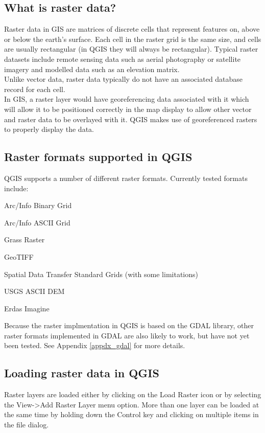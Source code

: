 \documentclass[10pt,english]{article}
\begin{document}
\begin{onehalfspace}
\subsection{What is raster data?}

Raster data in GIS are matrices of discrete cells that represent features on, above or below the earth's surface. Each cell in the raster grid is the same size, and cells are usually rectangular (in QGIS they will always be rectangular). Typical raster datasets include remote sensing data such as aerial photography or satellite imagery and modelled data such as an elevation matrix.\\

Unlike vector data, raster data typically do not have an associated database record for each cell.\\

In GIS, a raster layer would have georeferencing data associated with it which will allow it to be positioned correctly in the map display to allow other vector and raster data to be overlayed with it. QGIS makes use of georeferenced rasters to properly display the data.
	
\subsection{Raster formats supported in QGIS}
QGIS supports a number of different raster formats. Currently tested formats include:
\begin{compactitem}
\item Arc/Info Binary Grid
\item  Arc/Info ASCII Grid
\item Grass Raster
\item GeoTIFF
\item Spatial Data Transfer Standard Grids (with some limitations)
\item USGS ASCII DEM
\item Erdas Imagine
\end{compactitem}
Because the raster implmentation in QGIS is based on the GDAL library, other raster formats implemented in GDAL are also likely to work, but have not yet been tested. See Appendix \ref{appdx_gdal} for more details.
	
\subsection{Loading raster data in QGIS}
Raster layers are loaded either by clicking on the Load Raster icon or by selecting the View->Add Raster Layer menu option. More than one layer can be loaded at the same time by holding down the Control key and clicking on multiple items in the file dialog.\\
	

\end{onehalfspace}
\end{document}
